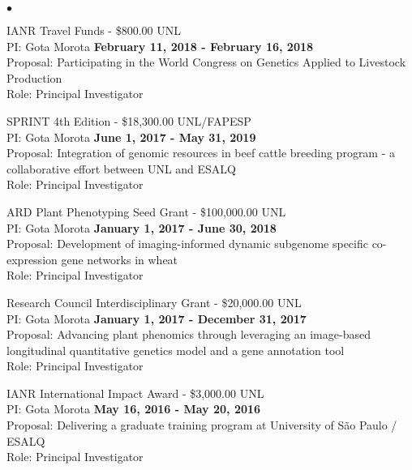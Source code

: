 \documentclass[margin,line,10pt]{res}
\newenvironment{list2}{
  \begin{list}{$\bullet$}{%
      \setlength{\itemsep}{0in}
      \setlength{\parsep}{0in} \setlength{\parskip}{0in}
      \setlength{\topsep}{0in} \setlength{\partopsep}{0in} 
      \setlength{\leftmargin}{0.2in}}}{\end{list}}
\begin{document}
\begin{resume}
\begin{list2}
\item IANR Travel Funds  - \$800.00  \hfill UNL\\
PI: Gota Morota   \hfill \textbf{February 11, 2018 - February 16, 2018}\\
Proposal: Participating in the World Congress on Genetics Applied to Livestock Production  \\
Role: Principal Investigator \\


\vspace{0.5cm}

\item SPRINT 4th Edition  - \$18,300.00  \hfill UNL/FAPESP\\
PI: Gota Morota   \hfill \textbf{June 1, 2017 - May 31, 2019}\\
Proposal: Integration of genomic resources in beef cattle breeding program - a collaborative effort between UNL and ESALQ  \\
Role: Principal Investigator \\


\vspace{0.5cm}
  
\item ARD Plant Phenotyping Seed Grant  - \$100,000.00  \hfill UNL\\
PI: Gota Morota   \hfill \textbf{January 1, 2017 - June 30, 2018}\\
Proposal: Development of imaging-informed dynamic subgenome specific co-expression gene networks in wheat  \\
Role: Principal Investigator \\

\vspace{0.5cm}

\item Research Council Interdisciplinary Grant  - \$20,000.00  \hfill UNL\\
PI: Gota Morota   \hfill \textbf{January 1, 2017 - December 31, 2017}\\
Proposal: Advancing plant phenomics through leveraging an image-based longitudinal quantitative genetics model and a gene annotation tool  \\
Role: Principal Investigator \\

\vspace{0.5cm}


\item IANR International Impact Award - \$3,000.00  \hfill UNL\\
PI: Gota Morota   \hfill \textbf{May 16, 2016 - May 20, 2016}\\
Proposal: Delivering a graduate training program at University of S{\~a}o Paulo / ESALQ  \\
Role: Principal Investigator \\ 


\end{list2}
\end{resume}
\end{document}
